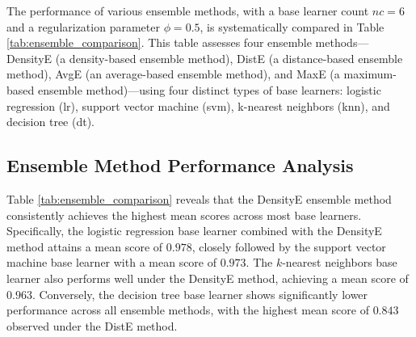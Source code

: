 \documentclass[lettersize,journal]{IEEEtran}
\begin{document}
	\noindent The performance of various ensemble methods, with a base learner count $nc = 6$ and a regularization parameter $\phi = 0.5$, is systematically compared in Table \ref{tab:ensemble_comparison}. This table assesses four ensemble methods—DensityE (a density-based ensemble method), DistE (a distance-based ensemble method), AvgE (an average-based ensemble method), and MaxE (a maximum-based ensemble method)—using four distinct types of base learners: logistic regression (lr), support vector machine (svm), k-nearest neighbors (knn), and decision tree (dt).
	
	\subsection{Ensemble Method Performance Analysis}\label{subsec:ensemble_performance}
	
	\noindent Table \ref{tab:ensemble_comparison} reveals that the DensityE ensemble method consistently achieves the highest mean scores across most base learners. Specifically, the logistic regression base learner combined with the DensityE method attains a mean score of $0.978$, closely followed by the support vector machine base learner with a mean score of $0.973$. The $k$-nearest neighbors base learner also performs well under the DensityE method, achieving a mean score of $0.963$.
	Conversely, the decision tree base learner shows significantly lower performance across all ensemble methods, with the highest mean score of $0.843$
	observed under the DistE method.
	
	\setlength{\tabcolsep}{2pt} %
	
	{\scriptsize\setlength{\tabcolsep}{3pt}}
	
\end{document}
